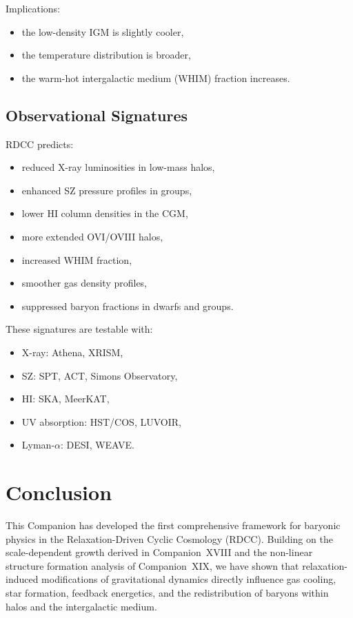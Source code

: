 \documentclass[11pt,a4paper]{article}
\begin{document}
Implications:
\begin{itemize}
\item the low-density IGM is slightly cooler,
\item the temperature distribution is broader,
\item the warm-hot intergalactic medium (WHIM) fraction increases.
\end{itemize}

\subsection{Observational Signatures}

RDCC predicts:
\begin{itemize}
\item reduced X-ray luminosities in low-mass halos,
\item enhanced SZ pressure profiles in groups,
\item lower HI column densities in the CGM,
\item more extended OVI/OVIII halos,
\item increased WHIM fraction,
\item smoother gas density profiles,
\item suppressed baryon fractions in dwarfs and groups.
\end{itemize}

These signatures are testable with:
\begin{itemize}
\item X-ray: Athena, XRISM,
\item SZ: SPT, ACT, Simons Observatory,
\item HI: SKA, MeerKAT,
\item UV absorption: HST/COS, LUVOIR,
\item Lyman-$\alpha$: DESI, WEAVE.
\end{itemize}

\section{Conclusion}

This Companion has developed the first comprehensive framework for baryonic physics in the
Relaxation-Driven Cyclic Cosmology (RDCC). Building on the scale-dependent growth derived
in Companion~XVIII and the non-linear structure formation analysis of Companion~XIX, we
have shown that relaxation-induced modifications of gravitational dynamics directly influence
gas cooling, star formation, feedback energetics, and the redistribution of baryons within halos
and the intergalactic medium.
\end{document}
